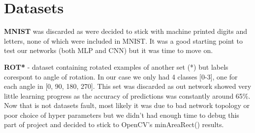 \documentclass[Report.tex]{subfiles}
\begin{document}
\section{Datasets}
\begin{flushleft}

\textbf{MNIST} was discarded as were decided to stick with machine printed digits and letters, none of which were included in MNIST. It was a good starting point to test our networks (both MLP and CNN) but it was time to move on.

\par
\textbf{ROT*} - dataset containing rotated examples of another set (*) but labels corespont to angle of rotation. In our case we only had 4 classes [0-3], one for each angle in [0, 90, 180, 270].
This set was discarded as out network showed very little learning progress as the accuracy of predictions was constantly around 65\%. Now that is not datasets fault, most likely it was due to bad network topology or poor choice of hyper parameters but we didn't had enough time to debug this part of project and decided to stick to OpenCV's minAreaRect() results.


\end{flushleft}
\end{document}
